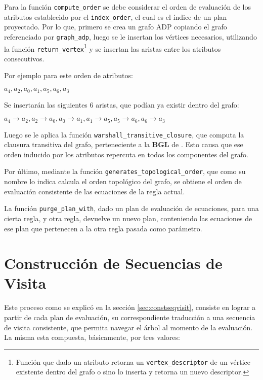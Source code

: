 Para la función \texttt{compute\_order} se debe considerar el orden de evaluación de los atributos establecido por el \texttt{index\_order}, el cual es el índice de un plan proyectado. Por lo que, primero se crea un grafo ADP copiando el grafo referenciado por \texttt{graph\_adp}, luego se le insertan los vértices necesarios, utilizando la función \texttt{return\_vertex}\footnote{Función que dado un atributo retorna un \texttt{vertex\_descriptor} de un vértice existente dentro del grafo o sino lo inserta y retorna un nuevo descriptor.} y se insertan las aristas entre los atributos consecutivos.

Por ejemplo para este orden de atributos:
\vspace{0.1cm}
\begin{center}
\Large\textbf{$a_{4}, a_{2}, a_{0}, a_{1}, a_{5}, a_{6}, a_{3}$}
\end{center}
\vspace{0.2cm}
Se insertarán las siguientes 6 aristas, que podían ya existir dentro del grafo:
\vspace{0.1cm}
\begin{center}
\Large\textbf{$a_{4} \rightarrow a_{2}, a_{2} \rightarrow a_{0}, a_{0} \rightarrow a_{1}, a_{1} \rightarrow a_{5}, a_{5} \rightarrow a_{6}, a_{6} \rightarrow a_{3}$}
\end{center}
\vspace{0.2cm}

Luego se le aplica la función \texttt{warshall\_transitive\_closure}, que computa la clausura transitiva del grafo, perteneciente a la \textbf{BGL} de \boost. Esto causa que ese orden inducido por los atributos repercuta en todos los componentes del grafo.

Por último, mediante la función \texttt{generates\_topological\_order}, que como su nombre lo indica calcula el orden topológico del grafo, se obtiene el orden de evaluación consistente de las ecuaciones de la regla actual.

La función \texttt{purge\_plan\_with}, dado un plan de evaluación de ecuaciones, para una cierta regla, y otra regla, devuelve un nuevo plan, conteniendo las ecuaciones de ese plan que pertenecen a la otra regla pasada como parámetro.

\section{Construcción de Secuencias de Visita}

Este proceso como se explicó en la sección \ref{sec:constseqvisit}, consiste en lograr a partir de cada plan de evaluación, su correspondiente traducción a una secuencia de visita consistente, que permita navegar el árbol al momento de la evaluación. La misma esta compuesta, básicamente, por tres valores:

